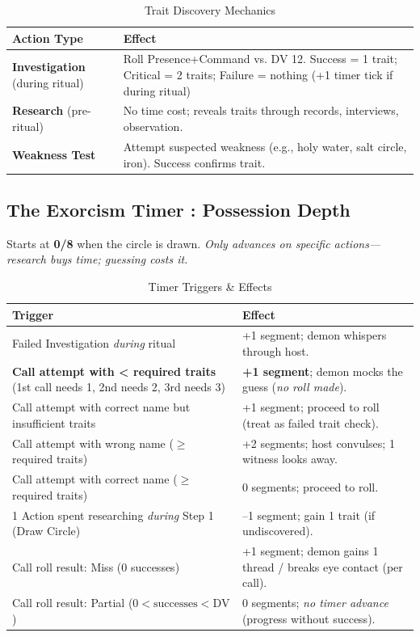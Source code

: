 \begin{table}[h!]
\centering
\caption{Trait Discovery Mechanics}
\begin{tabular}{@{}l p{10cm}@{}}
\toprule
\rowcolor[gray]{0.9}
\textbf{Action Type} & \textbf{Effect} \\
\midrule
\textbf{Investigation} (during ritual) & Roll Presence+Command vs. DV 12. Success = 1 trait; Critical = 2 traits; Failure = nothing (+1 timer tick if during ritual) \\
\textbf{Research} (pre-ritual) & No time cost; reveals traits through records, interviews, observation. \\
\textbf{Weakness Test} & Attempt suspected weakness (e.g., holy water, salt circle, iron). Success confirms trait. \\
\bottomrule
\end{tabular}
\label{tab:trait-discovery}
\end{table}

\subsection*{The Exorcism Timer : Possession Depth}
Starts at \textbf{0/8} when the circle is drawn. \textit{Only advances on specific actions---research buys time; guessing costs it.}

\begin{table}[h!]
\centering
\caption{Timer Triggers \& Effects}
\begin{tabular}{@{}l p{9cm}@{}}
\toprule
\rowcolor[gray]{0.9}
\textbf{Trigger} & \textbf{Effect} \\
\midrule
Failed Investigation \textit{during} ritual & +1 segment; demon whispers through host. \\
\textbf{Call attempt with < required traits} (1st call needs 1, 2nd needs 2, 3rd needs 3) & \textbf{+1 segment}; demon mocks the guess (\textit{no roll made}). \\
Call attempt with correct name but insufficient traits & +1 segment; proceed to roll (treat as failed trait check). \\
Call attempt with wrong name ($\geq$ required traits) & +2 segments; host convulses; 1 witness looks away. \\
Call attempt with correct name ($\geq$ required traits) & 0 segments; proceed to roll. \\
1 Action spent researching \textit{during} Step 1 (Draw Circle) & --1 segment; gain 1 trait (if undiscovered). \\
Call roll result: Miss (0 successes) & +1 segment; demon gains 1 thread / breaks eye contact (per call). \\
Call roll result: Partial ($0 < \text{successes} < \text{DV}$) & 0 segments; \textit{no timer advance} (progress without success). \\
\bottomrule
\end{tabular}
\label{tab:timer}
\end{table}

